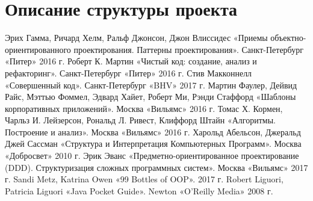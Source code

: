 \documentclass[russian,utf8,simple,hpadding=10mm,vpadding=20mm]{eskdtext}
\begin{document}
\newpage
\parindent=15mm
\section{Описание структуры проекта}

\renewcommand*\DTstylecomment{\rmfamily\color{black}\textsc}
\renewcommand*\DTstyle{\ttfamily\textcolor{black}}

\newpage
\begin{thebibliography}{99}
	Эрих Гамма, Ричард Хелм, Ральф Джонсон, Джон Влиссидес «Приемы объектно-ориентированного проектирования. Паттерны проектирования». Санкт-Петербург «Питер» 2016 г.
	Роберт К. Мартин «Чистый код: создание, анализ и рефакторинг». Санкт-Петербург «Питер» 2016 г.
	Стив Макконнелл «Совершенный код». Санкт-Петербург «BHV» 2017 г.
	Мартин Фаулер, Дейвид Райс, Мэттью Фоммел, Эдвард Хайет, Роберт Ми, Рэнди Стаффорд «Шаблоны корпоративных приложений». Москва «Вильямс» 2016 г.
	Томас Х. Кормен, Чарльз И. Лейзерсон, Рональд Л. Ривест, Клиффорд Штайн «Алгоритмы. Построение и анализ». Москва «Вильямс» 2016 г.
	Харольд Абельсон, Джеральд Джей Сассман «Структура и Интерпретация Компьютерных Программ». Москва «Добросвет» 2010 г.
	Эрик Эванс «Предметно-ориентированное проектирование (DDD). Структуризация сложных программных систем». Москва «Вильямс» 2017 г.
	Sandi Metz, Katrina Owen «99 Bottles of OOP». 2017 г.
	Robert Liguori, Patricia Liguori «Java Pocket Guide». Newton «O'Reilly Media» 2008 г.
\end{thebibliography}
\end{document}
